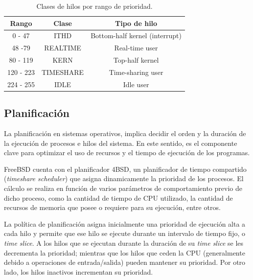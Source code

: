 \begin{table}[H]
    \centering
    \begin{tabular}{|c|c|c|}
        \hline
        \textbf{Rango} & \textbf{Clase} & \textbf{Tipo de hilo}          \\
        \hline
        0 - 47         & ITHD           & Bottom-half kernel (interrupt) \\
        \hline
        48 -79         & REALTIME       & Real-time user                 \\
        \hline
        80 - 119       & KERN           & Top-half kernel                \\
        \hline
        120 - 223      & TIMESHARE      & Time-sharing user              \\
        \hline
        224 - 255      & IDLE           & Idle user                      \\
        \hline
    \end{tabular}
    \caption{Clases de hilos por rango de prioridad.}
    \label{tabla:prio-hilos}
\end{table}


\subsection{Planificación}

La planificación en sistemas operativos, implica decidir el orden y la duración de la ejecución de procesos e hilos del sistema. En este sentido, es el componente clave para optimizar el uso de recursos y el tiempo de ejecución de los programas.\par

FreeBSD cuenta con el planificador 4BSD, un planificador de tiempo compartido (\textit{timeshare scheduler}) que asigna dinamicamente la prioridad de los procesos. El cálculo se realiza en función de varios parámetros de comportamiento previo de dicho proceso, como la cantidad de tiempo de CPU utilizado, la cantidad de recursos de memoria que posee o requiere para su ejecución, entre otros.\par

La política de planificación asigna inicialmente una prioridad de ejecución alta a cada hilo y permite que ese hilo se ejecute durante un intervalo de tiempo fijo, o \textit{time slice}. A los hilos que se ejecutan durante la duración de su \textit{time slice} se les decrementa la prioridad; mientras que los hilos que ceden la CPU (generalmente debido a operaciones de entrada/salida) pueden mantener su prioridad. Por otro lado, los hilos inactivos incrementan su prioridad.\par

